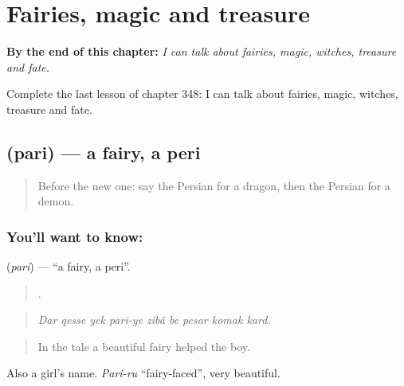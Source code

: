 
\chapter{Fairies, magic and treasure}
\label{ch:fa-fairies-magic-and-treasure}

\begin{chapteropening}
\textbf{By the end of this chapter:} \emph{I can talk about fairies, magic, witches, treasure and fate.}

Complete the last lesson of chapter 348: I can talk about fairies, magic, witches, treasure and fate.
\end{chapteropening}

\section[\texorpdfstring{\fa{پری} (pari)}{پری (pari)}]{ (pari) — a fairy, a peri}

\label{lesson:FA-C348-pari}



\begin{quote}
Before the new one: say the Persian for a dragon, then the Persian for a demon.
\end{quote}

\subsection*{You'll want to know: }
\textbf{} (\emph{pari}) — \textquotedblleft{}a fairy, a peri\textquotedblright{}.

\begin{quote}
        .
\end{quote}

\begin{quote}
\emph{Dar qesse yek pari-ye zibâ be pesar komak kard.}
\end{quote}

\begin{quote}
In the tale a beautiful fairy helped the boy.
\end{quote}

Also a girl's name. \emph{Pari-ru} \textquotedblleft{}fairy-faced\textquotedblright{}, very beautiful.

